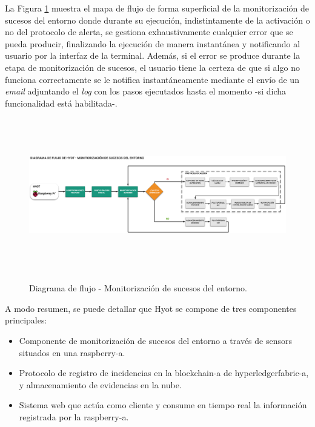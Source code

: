 \documentclass[12pt,a4paper, twoside]{report}
\begin{document}
	La Figura \ref{fig:hyot_flow} muestra el mapa de flujo de forma superficial de la monitorización de sucesos del entorno donde durante su ejecución, indistintamente de la activación o no del protocolo de alerta, se gestiona exhaustivamente cualquier error que se pueda producir, finalizando la ejecución de manera instantánea y notificando al usuario por la interfaz de la terminal. Además, si el error se produce durante la etapa de monitorización de sucesos, el usuario tiene la certeza de que si algo no funciona correctamente se le notifica instantáneamente mediante el envío de un \textit{email} adjuntando el \textit{log} con los pasos ejecutados hasta el momento -si dicha funcionalidad está habilitada-.
	
	\newpage
	
		\begin{figure}[!ht]   
			\caption{Diagrama de flujo - Monitorización de sucesos del entorno.} 
			\begin{center} 
	 			\includegraphics[width=18cm,height=6.7cm]{Images/implement/hyot_flow} \\
				\label{fig:hyot_flow} 
			\end{center}  
		\end{figure}

	A modo resumen, se puede detallar que Hyot se compone de tres componentes principales:

	\begin{itemize}
  		\item Componente de monitorización de sucesos del entorno a través de \glspl{sensor} situados en una \gls{raspberry-a}.
  		\item Protocolo de registro de incidencias en la \gls{blockchain-a} de \gls{hyperledgerfabric-a}, y almacenamiento de evidencias en la nube. 
  		\item Sistema web que actúa como cliente y consume en tiempo real la información registrada por la \gls{raspberry-a}.
	\end{itemize}
\end{document}
